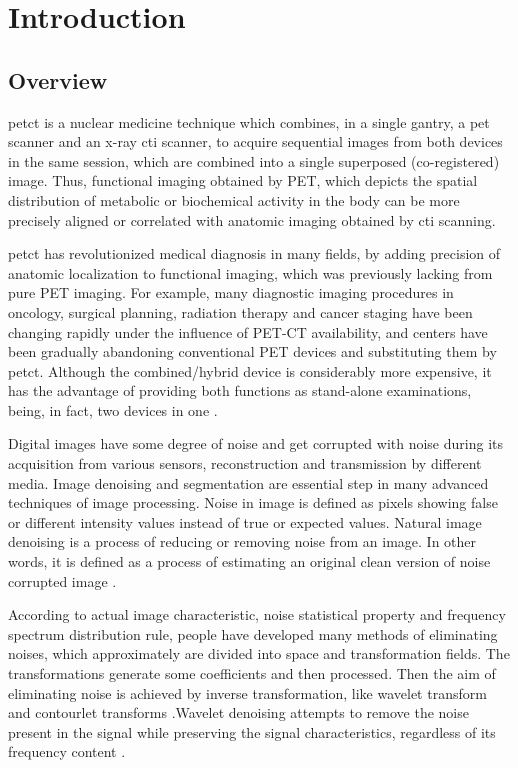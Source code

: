 \chapter{Introduction}
\label{chap:introduction}

\section{Overview}
\gls {petct} is a nuclear medicine technique which combines, in a single gantry, a \gls {pet} scanner and an x-ray \gls {cti} scanner, to acquire sequential images from both devices in the same session, which are combined into a single superposed (co-registered) image. Thus, functional imaging obtained by PET, which depicts the spatial distribution of metabolic or biochemical activity in the body can be more precisely aligned or correlated with anatomic imaging obtained by \gls {cti} scanning.

\gls {petct} has revolutionized medical diagnosis in many fields, by adding precision of anatomic localization to functional imaging, which was previously lacking from pure PET imaging. For example, many diagnostic imaging procedures in oncology, surgical planning, radiation therapy and cancer staging have been changing rapidly under the influence of PET-CT availability, and centers have been gradually abandoning conventional PET devices and substituting them by \gls {petct}. Although the combined/hybrid device is considerably more expensive, it has the advantage of providing both functions as stand-alone examinations, being, in fact, two devices in one \cite{belohlavek2008role}.

 Digital images have some degree of noise and get corrupted with noise during its acquisition from various sensors, reconstruction and transmission by different media. Image denoising and segmentation are essential step in many advanced techniques of image processing\cite{verma2013comparative}. Noise in image is defined as pixels showing false or different intensity values instead of true or expected values. Natural image denoising is a process of reducing or removing noise from an image. In other words, it is defined as a process of estimating an original clean version of noise corrupted image \cite{levin2011natural}.

 According to actual image characteristic, noise statistical property and frequency spectrum distribution rule, people have developed many methods of eliminating noises, which approximately are divided into space and transformation fields. The transformations generate some coefficients  and then  processed. Then the aim of eliminating noise is achieved by inverse transformation, like wavelet transform and contourlet transforms \cite{ruikar2011wavelet}\cite{matalon2005image}.Wavelet denoising attempts to remove the noise present in the signal while preserving the signal characteristics, regardless of its frequency content \cite{rangarajan2002image}.

